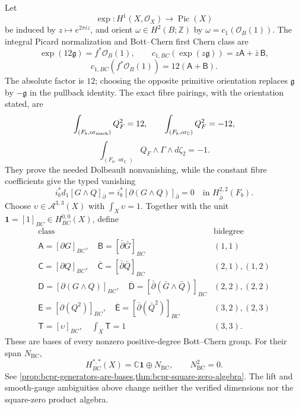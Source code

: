 \begin{enumerate}[leftmargin=1.8em]
Let
\[
 \exp:H^1(X,\mathcal O_X)\longrightarrow\operatorname{Pic}(X)
\]
be induced by \(z\mapsto e^{2\pi iz}\), and orient
\(\omega\in H^2(B;\mathbb Z)\) by
\(\omega=c_1(\mathcal O_B(1))\).  The integral Picard normalization and
Bott--Chern first Chern class are
\[
 \exp(12\mathfrak g)=f^*\mathcal O_B(1),\qquad
 c_{1,BC}(\exp(z\mathfrak g))=z\mathsf A+\bar z\,\mathsf B,
\]
\[
 c_{1,BC}(f^*\mathcal O_B(1))=12(\mathsf A+\mathsf B).
\]
The absolute factor is \(12\); choosing the opposite primitive orientation
replaces \(\mathfrak g\) by \(-\mathfrak g\) in the pullback identity.
The exact fibre pairings, with the orientation stated, are
\[
 \int_{(F_b,\operatorname{or}_{\rm mark})}Q_F^2=12,
 \qquad
 \int_{(F_b,\operatorname{or}_{\mathbb C})}Q_F^2=-12,
\]
\[
 \int_{(F_b,\operatorname{or}_{\mathbb C})}
 Q_F\wedge\Gamma\wedge d\zeta_2=-1.
\]
They prove the needed Dolbeault nonvanishing, while the constant fibre
coefficients give the typed vanishing
\[
 i_b^*d_1[G\wedge Q]_{\bar\partial}
 =i_b^*[\partial(G\wedge Q)]_{\bar\partial}=0
 \quad\text{in }H^{2,2}_{\bar\partial}(F_b).
\]
Choose \(\upsilon\in\mathcal A^{3,3}(X)\) with \(\int_X\upsilon=1\).
Together with the unit
\(\mathbf1=[1]_{BC}\in H^{0,0}_{BC}(X)\), define
\[
\begin{array}{c|c}
\text{class}&\text{bidegree}\\ \hline
\mathsf A=[\partial G]_{BC},\quad
 \mathsf B=[\bar\partial\bar G]_{BC}&(1,1)\\
\mathsf C=[\partial Q]_{BC},\quad
 \overline{\mathsf C}=[\bar\partial\bar Q]_{BC}&(2,1),(1,2)\\
\mathsf D=[\partial(G\wedge Q)]_{BC},\quad
 \overline{\mathsf D}=[\bar\partial(\bar G\wedge\bar Q)]_{BC}
 &(2,2),(2,2)\\
\mathsf E=[\partial(Q^2)]_{BC},\quad
 \overline{\mathsf E}=[\bar\partial(\bar Q^2)]_{BC}
 &(3,2),(2,3)\\
\mathsf T=[\upsilon]_{BC},\quad\int_X\mathsf T=1&(3,3).
\end{array}
\]
These are bases of every nonzero positive-degree Bott--Chern group.  For
their span \(N_{\mathrm{BC}}\),
\[
 H^{*,*}_{BC}(X)=\mathbb C\mathbf1\oplus N_{\mathrm{BC}},\qquad
 N_{\mathrm{BC}}^2=0.
\]
See
\cref{prop:bcpr-generators-are-bases,thm:bcpr-square-zero-algebra}.  The
lift and smooth-gauge ambiguities above change neither the verified
dimensions nor the square-zero product algebra.


\end{enumerate}
